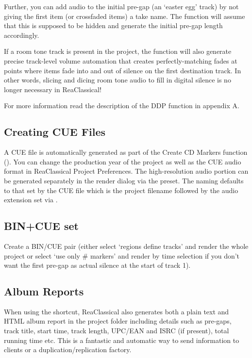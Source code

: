 \documentclass[10pt,american]{article}
\begin{document}
Further, you can add audio to the initial pre-gap (an `easter egg' track) by not
giving the first item (or crossfaded items) a take name. The function will
assume that this is supposed to be hidden and generate the initial pre-gap
length accordingly. 

If a room tone track is present in the project, the function will also generate
precise track-level volume automation that creates perfectly-matching fades at
points where items fade into and out of silence on the first destination track.
In other words, slicing and dicing room tone audio to fill in digital silence is
no longer necessary in ReaClassical!

For more information read the description of the DDP function in appendix A.

\subsection{Creating CUE Files}

A CUE file is automatically generated as part of the Create CD Markers function
(). You can change the production year of the project as well as the CUE
audio format in ReaClassical Project Preferences. The high-resolution audio
portion can be generated separately in the render dialog via the preset. The
naming defaults to that set by the CUE file which is the project filename
followed by the audio extension set via .

\subsection{BIN+CUE set}

Create a BIN/CUE pair (either select `regions define tracks\textquoteright{} and
render the whole project or select `use only \# markers' and render by time
selection if you don't want the first pre-gap as actual silence at the start of
track 1). 

\subsection{Album Reports}

When using the  shortcut, ReaClassical also generates both a plain text
and HTML album report in the project folder including details such as pre-gaps,
track title, start time, track length, UPC/EAN and ISRC (if present), total
running time etc. This is a fantastic and automatic way to send information to
clients or a duplication/replication factory.
\end{document}
